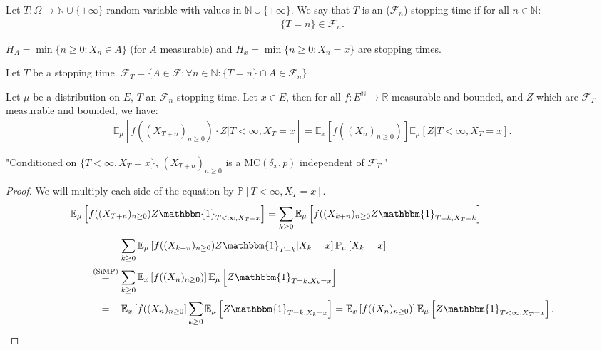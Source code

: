 \begin{defn}
	Let $T:\Omega \to \mathbb{N} \cup \{+\infty\}$ random variable with values in $\mathbb{N}\cup\{+\infty\}$. We say that $T$ is an ($ \mathcal{F}_n$)-stopping time if for all $n \in \mathbb{N}$:
	\begin{align}
		\{T=n\} \in \mathcal{F}_n
	.\end{align}
\end{defn}

\begin{ex}
	$H_{A}=\min\{n \geq 0: X_n \in  A\}$ (for $A$ measurable) and $H_x=\min\{n\geq 0: X_n = x\}$ are stopping times.
\end{ex}

\begin{defn}
	Let $T$ be a stopping time. $ \mathcal{F}_T=\{A \in \mathcal{F}: \forall n \in \mathbb{N}: \{T=n\}\cap A \in \mathcal{F}_n \}$
\end{defn}

\begin{theorem}
	Let $\mu $ be a distribution on $E$, $T$ an $ \mathcal{F}_n$-stopping time. Let $x \in E$,
	then for all $f:E^{\mathbb{N}} \to \mathbb{R}$ measurable and bounded, and $Z$ which are $ \mathcal{F}_T$ measurable and bounded, we have:
\begin{align}
	\boxed{ \mathbb{E}_{\mu } \left[ f((X_{T+n})_{n\geq 0}) \cdot Z | T<\infty, X_T=x \right] = \mathbb{E}_{x} \left[ f((X_n)_{n\geq 0}) \right]  \mathbb{E}_{\mu } \left[ Z | T<\infty, X_T=x \right].} 
\end{align}
\end{theorem}
\noindent
"Conditioned on $\{T<\infty,X_T=x\}$, $(X_{T+n})_{n\geq 0}$ is a $ \textrm{MC}(\delta_x,p)$ independent of $ \mathcal{F}_T$ "
\begin{proof}
We will multiply each side of the equation by $\mathbb{P}_{} \left[ T < \infty, X_T =x \right]$.
\begin{align}
&	\mathbb{E}_{\mu } \left[ f((X_{T+n})_{n\geq 0})Z \mathbbm{1}_{T<\infty, X_T=x}  \right] =
		\sum_{k\geq 0}^{} \mathbb{E}_{\mu } \left[ f((X_{k+n})_{n\geq 0} Z \mathbbm{1}_{T=k, X_T=k}  \right] \\
&\qquad	\stackrel{\phantom{\text{(SiMP)}}}{=}  \sum_{k\geq 0}^{} \mathbb{E}_{\mu } \left[ f((X_{k+n})_{n\geq 0}) Z \mathbbm{1}_{T=k} | X_k = x \right] \mathbb{P}_{\mu } \left[ X_k = x  \right] \\ 
&\qquad	\stackrel{\text{(SiMP)}}{=} \sum_{k\geq 0}^{} \mathbb{E}_{x} \left[ f((X_{n})_{n\geq 0}) \right] \mathbb{E}_{\mu } \left[ Z \mathbbm{1}_{T=k, X_k = x}  \right] \\
&\qquad	\stackrel{\phantom{\text{(SiMP)}}}{=} \mathbb{E}_{x} \left[ f((X_n)_{n\geq 0} \right] \sum_{k\geq 0}^{} \mathbb{E}_{\mu } \left[ Z \mathbbm{1}_{T=k, X_k=x}  \right]  
		= \mathbb{E}_{x} \left[ f((X_n)_{n\geq 0}) \right] \mathbb{E}_{\mu } \left[ Z \mathbbm{1}_{T<\infty, X_T=x}  \right] 
.\end{align}
\end{proof}


